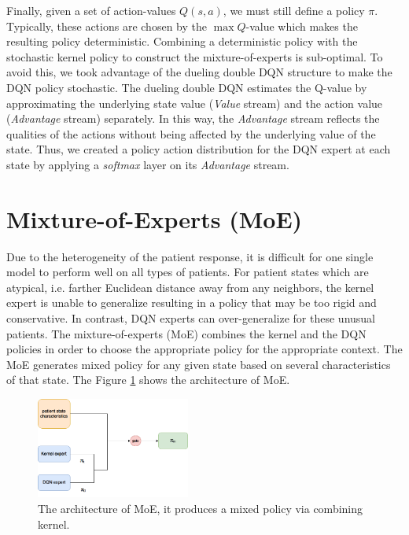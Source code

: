 \documentclass[10pt]{amia}
\begin{document}
Finally, given a set of action-values $Q(s,a)$, we must still define a policy $\pi$.  Typically, these actions are chosen by the $\max Q$-value which makes the resulting policy deterministic. Combining a deterministic policy with the stochastic kernel policy to construct the mixture-of-experts is sub-optimal. To avoid this, we took advantage of the dueling double DQN structure to make the DQN policy stochastic. The dueling double DQN estimates the Q-value by approximating the underlying state value (\textit{Value} stream) and the action value (\textit{Advantage} stream) separately.\cite{wang2015dueling} In this way, the \textit{Advantage} stream reflects the qualities of the actions without being affected by the underlying value of the state. Thus, we created a policy action distribution for the DQN expert at each state by applying a \textit{softmax} layer on its \textit{Advantage} stream. 

\section*{Mixture-of-Experts (MoE)}

Due to the heterogeneity of the patient response, it is difficult for one single model to perform well on all types of patients.\cite{parbhoo2017combining} For patient states which are atypical, i.e. farther Euclidean distance away from any neighbors, the kernel expert is unable to generalize resulting in a policy that may be too rigid and conservative. In contrast, DQN experts can over-generalize for these unusual patients. The mixture-of-experts (MoE) combines the kernel and the DQN policies in order to choose the appropriate policy for the appropriate context. The MoE generates mixed policy for any given state based on several characteristics of that state. The Figure \ref{fig:moe} shows the architecture of MoE.


\begin{figure}[H]
\centering
\includegraphics[width=0.45\textwidth]{figures/MOE}
\caption{\label{fig:moe} The architecture of MoE, it produces a mixed policy via combining kernel.}
\end{figure}
\end{document}
